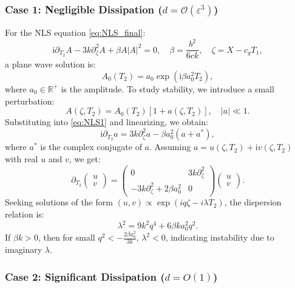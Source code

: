 \documentclass[alpha-refs, 12pt]{wiley-article}
\renewcommand{\O}{\mathcal{O}}
\newcommand{\ui}{\mathrm{i}}
\newcommand{\eps}{\varepsilon}
\begin{document}
\subsubsection*{Case 1: Negligible Dissipation ($d = \O(\eps^3)$)}

For the NLS equation \eqref{eq:NLS_final}:
\[
  \ui \partial_{T_2} A - 3 k \partial_\zeta^2 A + \beta A |A|^2 = 0, \quad \beta = \frac{b^2}{6 c k}, \quad \zeta = X - c_g T_1,
\]
a plane wave solution is:
\begin{equation}\label{eq:plane_wave_case1}
  A_0(T_2) = a_0 \exp(\ui \beta a_0^2 T_2),
\end{equation}
where $a_0 \in \mathbb{R}^+$ is the amplitude. To study stability, we introduce a small perturbation:
\begin{equation}\label{eq:perturbation_case1}
  A(\zeta, T_2) = A_0(T_2) [1 + a(\zeta, T_2)], \quad |a| \ll 1.
\end{equation}
Substituting into \eqref{eq:NLS1} and linearizing, we obtain:
\begin{equation}
\label{eq:linearized_case1}
  \ui \partial_{T_2} a = 3 k \partial_{\zeta}^2 a - \beta a_0^2 (a + a^*),
\end{equation}
where $a^*$ is the complex conjugate of $a$. Assuming $a = u(\zeta, T_2) + \ui v(\zeta, T_2)$ with real $u$ and $v$, we get:
\begin{equation}
\label{eq:matrix_case1}
\partial_{T_2} \begin{pmatrix} u \\ v \end{pmatrix} = \begin{pmatrix}
0 & 3 k \partial_\zeta^2 \\
-3 k \partial_\zeta^2 + 2 \beta a_0^2 & 0
\end{pmatrix} \begin{pmatrix} u \\ v \end{pmatrix}.
\end{equation}
Seeking solutions of the form $(u, v) \propto \exp(i q \zeta - i \lambda T_2)$, the dispersion relation is:
\begin{equation}
\label{eq:dispersion_case1}
\lambda^2 = 9 k^2 q^4 + 6 \beta k a_0^2 q^2.
\end{equation}
If $\beta k > 0$, then for small $q^2 < -\frac{2 \beta a_0^2}{3 k}$, $\lambda^2 < 0$, indicating instability due to imaginary $\lambda$.

\subsubsection*{Case 2: Significant Dissipation ($d = O(1)$)}
\end{document}
